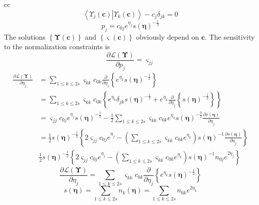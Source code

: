 \documentclass[aps,preprint]{revtex4}%
\begin{document}
cc%
\[
\left\langle \left.  \Upsilon_{j}\left(  \mathbf{c}\right)  \right\vert
\Upsilon_{k}\left(  \mathbf{c}\right)  \right\rangle -c_{j}\delta_{jk}=0
\]%
\[
p_{j}=c_{0j}e^{\eta_{j}}\mathit{s}\left(  \mathbf{\eta}\right)  ^{-\frac{1}%
{2}}%
\]
The solutions $\left\{  \mathbf{\Upsilon}\left(  \mathbf{c}\right)  \right\}
$ and $\left\{  \mathbf{\varsigma}\left(  \mathbf{c}\right)  \right\}  $
obviously depend on $\mathbf{c}$. The sensitivity to the normalization
constraints is%
\begin{equation}
\frac{\partial\mathcal{L}\left(  \mathbf{\Upsilon}\right)  }{\partial p_{j}%
}=\varsigma_{jj}%
\end{equation}%
\begin{align*}
\frac{\partial\mathcal{L}\left(  \mathbf{\Upsilon}\right)  }{\partial\eta_{j}}
&  =\sum_{1\leq k\leq2s}\varsigma_{kk}c_{0k}\frac{\partial}{\partial\eta_{j}%
}\left\{  e^{\eta_{k}}\mathit{s}\left(  \mathbf{\eta}\right)  ^{-\frac{1}{2}%
}\right\}  \\
&  =\sum_{1\leq k\leq2s}\varsigma_{kk}c_{0k}\left\{  e^{\eta_{k}}\delta
_{jk}\mathit{s}\left(  \mathbf{\eta}\right)  ^{-\frac{1}{2}}+e^{\eta_{k}}%
\frac{\partial}{\partial\eta_{j}}\left\{  \mathit{s}\left(  \mathbf{\eta
}\right)  ^{-\frac{1}{2}}\right\}  \right\}  \\
&  =\varsigma_{jj}c_{0j}e^{\eta_{j}}\mathit{s}\left(  \mathbf{\eta}\right)
^{-\frac{1}{2}}-\frac{1}{2}\sum_{1\leq k\leq2s}\varsigma_{kk}c_{0k}e^{\eta
_{k}}\mathit{s}\left(  \mathbf{\eta}\right)  ^{-\frac{3}{2}}\frac
{\partial\mathit{s}\left(  \mathbf{\eta}\right)  }{\partial\eta_{j}}\\
&  =\frac{1}{2}\mathit{s}\left(  \mathbf{\eta}\right)  ^{-\frac{1}{2}}\left\{
2\varsigma_{jj}c_{0j}e^{\eta_{j}}-\left(  \sum_{1\leq k\leq2s}\varsigma
_{kk}c_{0k}e^{\eta_{k}}\right)  \mathit{s}\left(  \mathbf{\eta}\right)
^{-1}\frac{\partial\mathit{s}\left(  \mathbf{\eta}\right)  }{\partial\eta_{j}%
}\right\}  \\
&  \frac{1}{2}\mathit{s}\left(  \mathbf{\eta}\right)  ^{-\frac{1}{2}}\left\{
2\varsigma_{jj}c_{0j}e^{\eta_{j}}-\left(  \sum_{1\leq k\leq2s}\varsigma
_{kk}c_{0k}e^{\eta_{k}}\right)  \mathit{s}\left(  \mathbf{\eta}\right)
^{-1}n_{0j}e^{2\eta_{j}}\right\}
\end{align*}%
\[
\frac{\partial\mathcal{L}\left(  \mathbf{\Upsilon}\right)  }{\partial\eta_{j}%
}=\sum_{1\leq k\leq2s}\varsigma_{kk}c_{0k}\frac{\partial}{\partial\eta_{j}%
}\left\{  e^{\eta_{k}}\mathit{s}\left(  \mathbf{\eta}\right)  ^{-\frac{1}{2}%
}\right\}
\]%
\[
\mathit{s}\left(  \mathbf{\eta}\right)  =\sum_{1\leq k\leq2s}n_{k}\left(
\mathbf{\eta}\right)  =\sum_{1\leq k\leq2s}n_{0k}e^{2\eta_{k}}%
\]%
\end{document}
